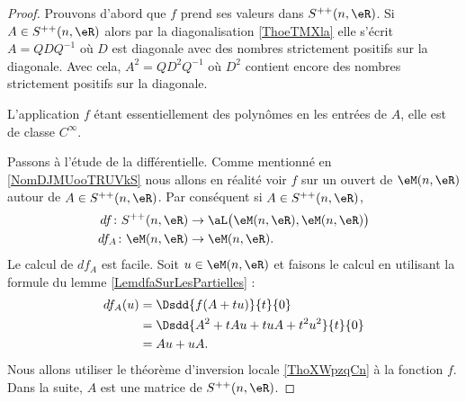 \begin{proof}
    Prouvons d'abord que \( f\) prend ses valeurs dans \( S^{++}(n,\eR)\). Si \( A\in S^{++}(n,\eR)\) alors par la diagonalisation \ref{ThoeTMXla} elle s'écrit \( A=QDQ^{-1}\) où \( D\) est diagonale avec des nombres strictement positifs sur la diagonale. Avec cela, \( A^2=QD^2Q^{-1}\) où \( D^2\) contient encore des nombres strictement positifs sur la diagonale.

    L'application \( f\) étant essentiellement des polynômes en les entrées de \( A\), elle est de classe \( C^{\infty}\).

    Passons à l'étude de la différentielle. Comme mentionné en \ref{NomDJMUooTRUVkS} nous allons en réalité voir \( f\) sur un ouvert de \( \eM(n,\eR)\) autour de \( A\in S^{++}(n,\eR)\). Par conséquent si \( A\in S^{++}(n,\eR)\),
    \begin{subequations}
        \begin{align}
            df\colon S^{++}(n,\eR)&\to \aL\big( \eM(n,\eR),\eM(n,\eR) \big)\\
            df_A\colon \eM(n,\eR)&\to \eM(n,\eR).
        \end{align}
    \end{subequations}
    Le calcul de \( df_A\) est facile. Soit \( u\in \eM(n,\eR)\) et faisons le calcul en utilisant la formule du lemme \eqref{LemdfaSurLesPartielles} :
    \begin{subequations}
        \begin{align}
            df_A(u)&=\Dsdd{ f(A+tu) }{t}{0}\\
            &=\Dsdd{ A^2+tAu+tuA+t^2u^2 }{t}{0}\\
            &=Au+uA.
        \end{align}
    \end{subequations}
    Nous allons utiliser le théorème d'inversion locale \ref{ThoXWpzqCn} à la fonction \( f\). Dans la suite, \( A\) est une matrice de \( S^{++}(n,\eR)\).


\end{proof}
